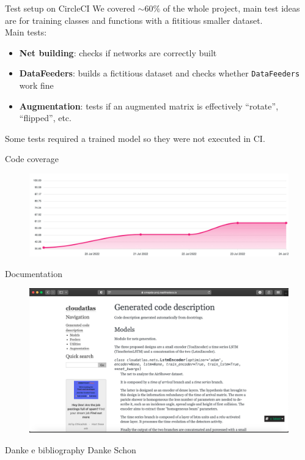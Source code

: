 \documentclass{beamer}
\begin{document}

\begin{frame}{Test setup on CircleCI}
We covered $\sim 60\%$ of the whole project, main test ideas are for training classes and functions with a fititious
smaller dataset.\\
Main tests:
\begin{itemize}
    \item[\textbullet] \textbf{Net building}: checks if networks are correctly built
    \item[\textbullet] \textbf{DataFeeders}: builds a fictitious dataset and checks whether \texttt{DataFeeders} work fine
    \item[\textbullet] \textbf{Augmentation}: tests if an augmented matrix is effectively ``rotate'', ``flipped'', etc.
\end{itemize}
    \vfill
    Some tests required a trained model so they were not executed in CI.
\end{frame}
\begin{frame}{Code coverage}
\begin{figure}
    \centering
    \includegraphics[width=\textwidth]{figures/dabyfosy.png}
\end{figure}

\end{frame}

\begin{frame}{Documentation}
    \begin{figure}
        \centering
        \includegraphics[width=\textwidth]{figures/docs.png}
    \end{figure}
    
    \end{frame}
    

\begin{frame}{Danke e bibliography}
\centering
Danke Schon

    
\end{frame}
\end{document}
